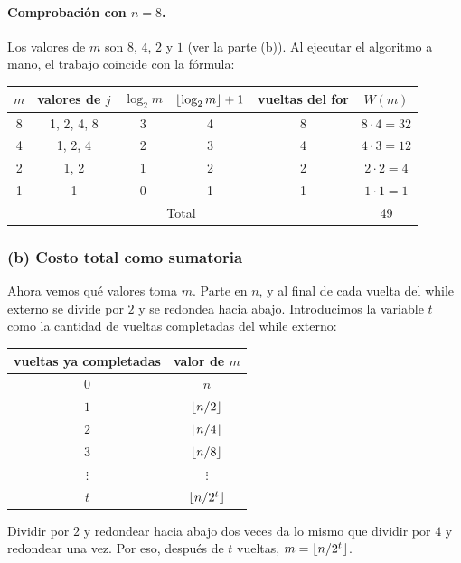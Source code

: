 \noindent\begin{minipage}{\linewidth}
\paragraph{Comprobación con $n = 8$.}
Los valores de $m$ son $8$, $4$, $2$ y $1$ (ver la parte (b)). Al ejecutar el algoritmo a
mano, el trabajo coincide con la fórmula:
\begin{center}
\begin{tabular}{cccccc}
  \toprule
  $m$ & valores de $j$ & $\log_2 m$ & $\lfloor\log_2 m\rfloor + 1$ & vueltas del for & $W(m)$ \\
  \midrule
  8 & 1, 2, 4, 8 & 3 & 4 & 8 & $8 \cdot 4 = 32$ \\
  4 & 1, 2, 4    & 2 & 3 & 4 & $4 \cdot 3 = 12$ \\
  2 & 1, 2       & 1 & 2 & 2 & $2 \cdot 2 = 4$ \\
  1 & 1          & 0 & 1 & 1 & $1 \cdot 1 = 1$ \\
  \midrule
  \multicolumn{5}{c}{Total} & 49 \\
  \bottomrule
\end{tabular}
\end{center}
\end{minipage}

\subsubsection*{(b) Costo total como sumatoria}

Ahora vemos qué valores toma $m$. Parte en $n$, y al final de cada vuelta del while
externo se divide por $2$ y se redondea hacia abajo. Introducimos la variable $t$ como la
cantidad de vueltas completadas del while externo:
\begin{center}
\begin{tabular}{cc}
  \toprule
  vueltas ya completadas & valor de $m$ \\
  \midrule
  $0$ & $n$ \\
  $1$ & $\lfloor n/2\rfloor$ \\
  $2$ & $\lfloor n/4\rfloor$ \\
  $3$ & $\lfloor n/8\rfloor$ \\
  $\vdots$ & $\vdots$ \\
  $t$ & $\lfloor n/2^t\rfloor$ \\
  \bottomrule
\end{tabular}
\end{center}
Dividir por $2$ y redondear hacia abajo dos veces da lo mismo que dividir por $4$ y
redondear una vez. Por eso, después de $t$ vueltas, $m = \lfloor n/2^t\rfloor$.

